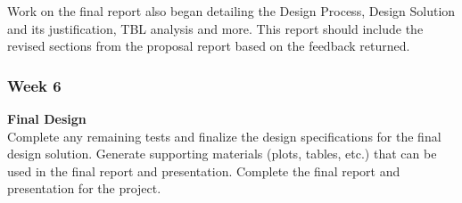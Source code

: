 \documentclass[../CourseManual.tex]{subfiles}
\begin{document}
Work on the final report also began detailing the Design Process, Design Solution and its justification,  TBL analysis and more. This report should include the revised sections from the proposal report based on the feedback returned.

\subsubsection{Week 6} \label{Week 6: Flocking}
\textbf{Final Design}\\
Complete any remaining tests and finalize the design specifications for the final design solution. Generate supporting materials (plots, tables, etc.) that can be used in the final report and presentation. Complete the final report and presentation for the project.
\end{document}
